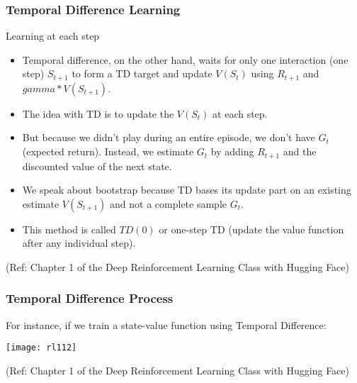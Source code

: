\begin{frame}[fragile]\frametitle{Temporal Difference Learning}

Learning at each step

\begin{itemize}
\item Temporal difference, on the other hand, waits for only one interaction (one step) $S_{t+1}$ to form a TD target and update $V(S_t)$ using $R_{t+1}$ and $gamma * V(S_{t+1})$.
\item The idea with TD is to update the $V(S_t)$ at each step.
\item But because we didn't play during an entire episode, we don't have $G_t$ (expected return). Instead, we estimate $G_t$ by adding $R_{t+1}$ and the discounted value of the next state.
\item We speak about bootstrap because TD bases its update part on an existing estimate $V(S_{t+1})$ and not a complete sample $G_t$.
\item This method is called $TD(0)$ or one-step TD (update the value function after any individual step).

\end{itemize}


{\tiny (Ref: Chapter 1 of the Deep Reinforcement Learning Class with Hugging Face)}

\end{frame}

\begin{frame}[fragile]\frametitle{Temporal Difference Process}

For instance, if we train a state-value function using Temporal Difference:

\begin{center}
\texttt{[image: rl112]}
\end{center}

{\tiny (Ref: Chapter 1 of the Deep Reinforcement Learning Class with Hugging Face)}

\end{frame}

